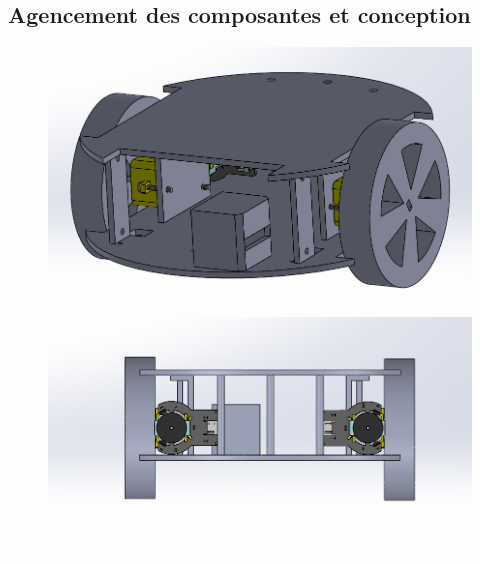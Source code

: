 \documentclass[a4paper,11pt]{article}
\begin{document}
\subsection{Agencement des composantes et conception}

\begin{figure}[H]
    \begin{minipage}[c]{.46\linewidth}
        \centering
        \includegraphics[scale = 0.3]{Chassis_av_cote.png}
    \end{minipage}
    \hfill
    \begin{minipage}[c]{.46\linewidth}
        \centering
        \includegraphics[scale = 0.3]{Chassis_arr.png}
    \end{minipage}
\end{figure}
\end{document}
